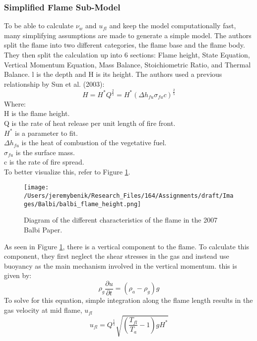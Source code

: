 \documentclass{article}
\begin{document}
\subsubsection{Simplified Flame Sub-Model}
\indent To be able to calculate $\nu _ w$ and $u_{fl}$ and keep the model computationally fast, many simplifying assumptions are made to generate a simple model. The authors split the flame into two different categories, the flame base and the flame body. They then split the calculation up into 6 sections: Flame height, State Equation, Vertical Momentum Equation, Mass Balance, Stoichiometric Ratio, and Thermal Balance. l is the depth and H is its height. The authors used a previous relationship by Sun et al. (2003):
\begin{equation}
	\label{Flame height}
	H = H^{*} Q^{\frac {2}{5}} = H^{*}(\Delta h_{fu} \sigma _{fu} c) ^{\frac {2}{5}}
\end{equation}
Where:\\
H is the flame height.\\
Q is the rate of heat release per unit length of fire front. \\
$H^{*}$ is a parameter to fit. \\
$\Delta h_{fu}$ is the heat of combustion of the vegetative fuel. \\
$\sigma _{fu}$ is the surface mass. \\
c is the rate of fire spread.  \\ 
To better visualize this, refer to Figure \ref{Balbi_flame_height_diagram}.
\begin{figure}[h]
\centering
  \texttt{[image: /Users/jeremybenik/Research\_Files/164/Assignments/draft/Images/Balbi/balbi\_flame\_height.png]}
  \caption{Diagram of the different characteristics of the flame in the 2007 Balbi Paper.}
  \label{Balbi_flame_height_diagram}
\end{figure}

\indent As seen in Figure \ref{Balbi_flame_height_diagram}, there is a vertical component to the flame. To calculate this component, they first neglect the shear stresses in the gas and instead use buoyancy as the main mechanism involved in the vertical momentum. this is given by: 
\begin{equation}
	\label{Vertical momentum Balbi}
	\rho _ g \frac {\partial u} {\partial t} = (\rho _a - \rho _g) g
\end{equation}
\indent To solve for this equation, simple integration along the flame length results in the gas velocity at mid flame, $u_{fl}$
\begin{equation}
	\label{gas velocity}
	u_{fl} = Q ^ {\frac {1}{5}} \sqrt{(\frac {T_{fl}} {T_a} - 1) g H^{*}}
\end{equation}
\end{document}
